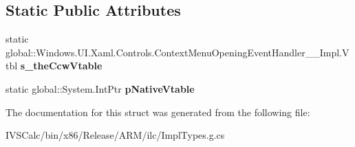 \subsection*{Static Public Attributes}
\begin{DoxyCompactItemize}
\item 
\mbox{\label{struct_windows_1_1_u_i_1_1_xaml_1_1_controls_1_1_context_menu_opening_event_handler_____impl_1_1_vtbl_a8de923152bfc112f43516f481d156012}} 
static global\+::\+Windows.\+U\+I.\+Xaml.\+Controls.\+Context\+Menu\+Opening\+Event\+Handler\+\_\+\+\_\+\+Impl.\+Vtbl {\bfseries s\+\_\+the\+Ccw\+Vtable}
\item 
\mbox{\label{struct_windows_1_1_u_i_1_1_xaml_1_1_controls_1_1_context_menu_opening_event_handler_____impl_1_1_vtbl_aaf6d667eb1d652761299585b30b3b26a}} 
static global\+::\+System.\+Int\+Ptr {\bfseries p\+Native\+Vtable}
\end{DoxyCompactItemize}


The documentation for this struct was generated from the following file\+:\begin{DoxyCompactItemize}
\item 
I\+V\+S\+Calc/bin/x86/\+Release/\+A\+R\+M/ilc/Impl\+Types.\+g.\+cs\end{DoxyCompactItemize}
